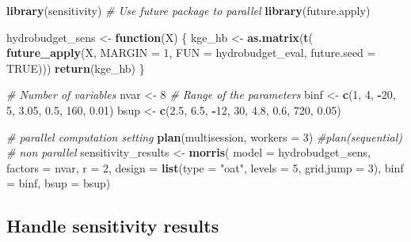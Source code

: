 \documentclass[
]{book}
\newenvironment{Shaded}{\begin{snugshade}}{\end{snugshade}}
\newcommand{\AttributeTok}[1]{\textcolor[rgb]{0.13,0.29,0.53}{#1}}
\newcommand{\CommentTok}[1]{\textcolor[rgb]{0.56,0.35,0.01}{\textit{#1}}}
\newcommand{\ConstantTok}[1]{\textcolor[rgb]{0.56,0.35,0.01}{#1}}
\newcommand{\ControlFlowTok}[1]{\textcolor[rgb]{0.13,0.29,0.53}{\textbf{#1}}}
\newcommand{\DecValTok}[1]{\textcolor[rgb]{0.00,0.00,0.81}{#1}}
\newcommand{\FloatTok}[1]{\textcolor[rgb]{0.00,0.00,0.81}{#1}}
\newcommand{\FunctionTok}[1]{\textcolor[rgb]{0.13,0.29,0.53}{\textbf{#1}}}
\newcommand{\NormalTok}[1]{#1}
\newcommand{\OtherTok}[1]{\textcolor[rgb]{0.56,0.35,0.01}{#1}}
\newcommand{\SpecialCharTok}[1]{\textcolor[rgb]{0.81,0.36,0.00}{\textbf{#1}}}
\newcommand{\StringTok}[1]{\textcolor[rgb]{0.31,0.60,0.02}{#1}}
\begin{document}
\begin{Shaded}
\begin{Highlighting}[]
\FunctionTok{library}\NormalTok{(sensitivity)}
\CommentTok{\# Use future package to parallel}
\FunctionTok{library}\NormalTok{(future.apply)}

\NormalTok{hydrobudget\_sens }\OtherTok{\textless{}{-}} \ControlFlowTok{function}\NormalTok{(X) \{}
\NormalTok{  kge\_hb }\OtherTok{\textless{}{-}} \FunctionTok{as.matrix}\NormalTok{(}\FunctionTok{t}\NormalTok{(}
    \FunctionTok{future\_apply}\NormalTok{(X, }\AttributeTok{MARGIN =} \DecValTok{1}\NormalTok{, }\AttributeTok{FUN =}\NormalTok{ hydrobudget\_eval, }\AttributeTok{future.seed =} \ConstantTok{TRUE}\NormalTok{)))}
  \FunctionTok{return}\NormalTok{(kge\_hb)}
\NormalTok{\}}

\CommentTok{\# Number of variables}
\NormalTok{nvar }\OtherTok{\textless{}{-}} \DecValTok{8}
\CommentTok{\# Range of the parameters}
\NormalTok{binf }\OtherTok{\textless{}{-}} \FunctionTok{c}\NormalTok{(}\DecValTok{1}\NormalTok{, }\DecValTok{4}\NormalTok{, }\SpecialCharTok{{-}}\DecValTok{20}\NormalTok{, }\DecValTok{5}\NormalTok{, }\FloatTok{3.05}\NormalTok{, }\FloatTok{0.5}\NormalTok{, }\DecValTok{160}\NormalTok{, }\FloatTok{0.01}\NormalTok{)}
\NormalTok{bsup }\OtherTok{\textless{}{-}} \FunctionTok{c}\NormalTok{(}\FloatTok{2.5}\NormalTok{, }\FloatTok{6.5}\NormalTok{, }\SpecialCharTok{{-}}\DecValTok{12}\NormalTok{, }\DecValTok{30}\NormalTok{, }\FloatTok{4.8}\NormalTok{, }\FloatTok{0.6}\NormalTok{, }\DecValTok{720}\NormalTok{, }\FloatTok{0.05}\NormalTok{)}

\CommentTok{\# parallel computation setting}
\FunctionTok{plan}\NormalTok{(multisession, }\AttributeTok{workers =} \DecValTok{3}\NormalTok{)}
\CommentTok{\#plan(sequential) \# non parallel}
\NormalTok{sensitivity\_results }\OtherTok{\textless{}{-}} \FunctionTok{morris}\NormalTok{(}
  \AttributeTok{model =}\NormalTok{ hydrobudget\_sens,}
  \AttributeTok{factors =}\NormalTok{ nvar,}
  \AttributeTok{r =} \DecValTok{2}\NormalTok{,}
  \AttributeTok{design =} \FunctionTok{list}\NormalTok{(}\AttributeTok{type =} \StringTok{"oat"}\NormalTok{, }\AttributeTok{levels =} \DecValTok{5}\NormalTok{, }\AttributeTok{grid.jump =} \DecValTok{3}\NormalTok{),}
  \AttributeTok{binf =}\NormalTok{ binf,}
  \AttributeTok{bsup =}\NormalTok{ bsup)}
\end{Highlighting}
\end{Shaded}

\hypertarget{handle-sensitivity-results}{%
\subsection{Handle sensitivity results}\label{handle-sensitivity-results}}
\end{document}

